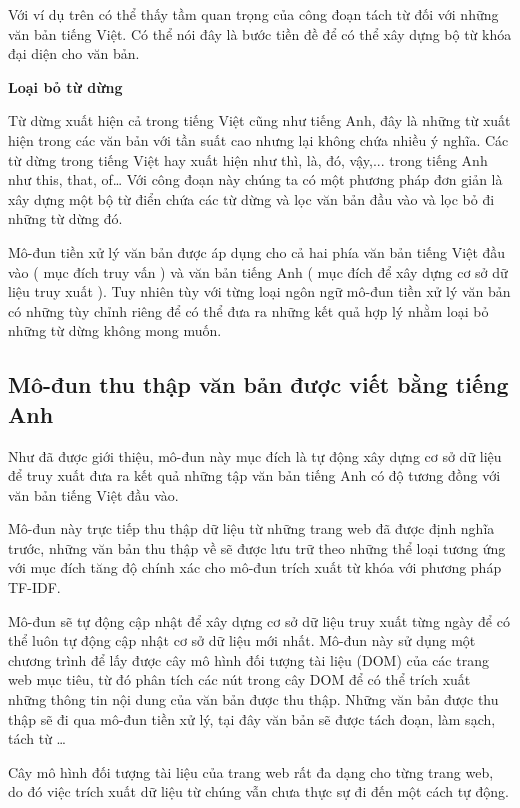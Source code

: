 \documentclass[12pt]{report}
\begin{document}
Với ví dụ trên có thể thấy tầm quan trọng của công đoạn tách từ đối với những văn bản tiếng Việt. Có thể nói đây là bước tiền đề để có thể xây dựng bộ từ khóa đại diện cho văn bản.

\textbf{Loại bỏ từ dừng}

Từ dừng xuất hiện cả trong tiếng Việt cũng như tiếng Anh, đây là những từ xuất hiện trong các văn bản với tần suất cao nhưng lại không chứa nhiều ý nghĩa. Các từ dừng trong tiếng Việt hay xuất hiện như thì, là, đó, vậy,... trong tiếng Anh như this, that, of…
Với công đoạn này chúng ta có một phương pháp đơn giản là xây dựng một bộ từ điển chứa các từ dừng và lọc văn bản đầu vào và lọc bỏ đi những từ dừng đó.

Mô-đun tiền xử lý văn bản được áp dụng cho cả hai phía văn bản tiếng Việt đầu vào ( mục đích truy vấn ) và văn bản tiếng Anh  ( mục đích để xây dựng cơ sở dữ liệu truy xuất ). Tuy nhiên tùy với từng loại ngôn ngữ mô-đun tiền xử lý văn bản có những tùy chỉnh riêng để có thể đưa ra những kết quả hợp lý nhằm loại bỏ những từ dừng không mong muốn.

\subsection{Mô-đun thu thập văn bản được viết bằng tiếng Anh}

Như đã được giới thiệu, mô-đun này mục đích là tự động xây dựng cơ sở dữ liệu để truy xuất đưa ra kết quả những tập văn bản tiếng Anh có độ tương đồng với văn bản tiếng Việt đầu vào.

Mô-đun này trực tiếp thu thập dữ liệu từ những trang web đã được định nghĩa trước, những văn bản thu thập về sẽ được lưu trữ theo những thể loại tương ứng với mục đích tăng độ chính xác cho mô-đun trích xuất từ khóa với phương pháp TF-IDF.

Mô-đun sẽ tự động cập nhật để xây dựng cơ sở dữ liệu truy xuất từng ngày để có thể luôn tự động cập nhật cơ sở dữ liệu mới nhất. Mô-đun này sử dụng một chương trình để lấy được cây mô hình đối tượng tài liệu (DOM) của các trang web mục tiêu, từ đó phân tích các nút trong cây DOM để có thể trích xuất những thông tin nội dung của văn bản được thu thập. Những văn bản được thu thập sẽ đi qua mô-đun tiền xử lý, tại đây văn bản sẽ được tách đoạn, làm sạch, tách từ \dots

Cây mô hình đối tượng tài liệu của trang web rất đa dạng cho từng trang web, do đó việc trích xuất dữ liệu từ chúng vẫn chưa thực sự đi đến một cách tự động.
\end{document}
